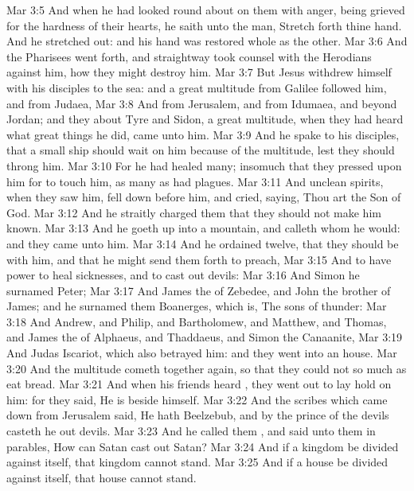 \vs Mar 3:5 And when he had looked round about on them with anger, being grieved for the hardness of their hearts, he saith unto the man, Stretch forth thine hand. And he stretched  out: and his hand was restored whole as the other.
\vs Mar 3:6 And the Pharisees went forth, and straightway took counsel with the Herodians against him, how they might destroy him.
\vs Mar 3:7 But Jesus withdrew himself with his disciples to the sea: and a great multitude from Galilee followed him, and from Judaea,
\vs Mar 3:8 And from Jerusalem, and from Idumaea, and  beyond Jordan; and they about Tyre and Sidon, a great multitude, when they had heard what great things he did, came unto him.
\vs Mar 3:9 And he spake to his disciples, that a small ship should wait on him because of the multitude, lest they should throng him.
\vs Mar 3:10 For he had healed many; insomuch that they pressed upon him for to touch him, as many as had plagues.
\vs Mar 3:11 And unclean spirits, when they saw him, fell down before him, and cried, saying, Thou art the Son of God.
\vs Mar 3:12 And he straitly charged them that they should not make him known.
\vs Mar 3:13 And he goeth up into a mountain, and calleth  whom he would: and they came unto him.
\vs Mar 3:14 And he ordained twelve, that they should be with him, and that he might send them forth to preach,
\vs Mar 3:15 And to have power to heal sicknesses, and to cast out devils:
\vs Mar 3:16 And Simon he surnamed Peter;
\vs Mar 3:17 And James the  of Zebedee, and John the brother of James; and he surnamed them Boanerges, which is, The sons of thunder:
\vs Mar 3:18 And Andrew, and Philip, and Bartholomew, and Matthew, and Thomas, and James the  of Alphaeus, and Thaddaeus, and Simon the Canaanite,
\vs Mar 3:19 And Judas Iscariot, which also betrayed him: and they went into an house.
\vs Mar 3:20 And the multitude cometh together again, so that they could not so much as eat bread.
\vs Mar 3:21 And when his friends heard , they went out to lay hold on him: for they said, He is beside himself.
\vs Mar 3:22 And the scribes which came down from Jerusalem said, He hath Beelzebub, and by the prince of the devils casteth he out devils.
\vs Mar 3:23 And he called them , and said unto them in parables, How can Satan cast out Satan?
\vs Mar 3:24 And if a kingdom be divided against itself, that kingdom cannot stand.
\vs Mar 3:25 And if a house be divided against itself, that house cannot stand.
